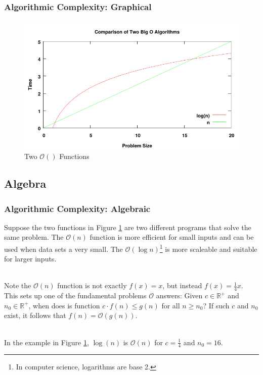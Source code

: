 \documentclass[aspectratio=169]{beamer}
\begin{document}
\begin{frame}
\frametitle{Algorithmic Complexity: Graphical}
\begin{figure}
\includegraphics[scale=0.725]{../artifacts/big-o-plot.pdf}
\caption{Two $\mathcal{O}()$ Functions}
\label{fig:big-o}
\end{figure}
\end{frame}

\subsection{Algebra}
\begin{frame}
\frametitle{Algorithmic Complexity: Algebraic}
Suppose the two functions in Figure \ref{fig:big-o} are two different programs that solve the same problem. The $\mathcal{O}(n)$ function is more efficient for small inputs and can be used when data sets a very small. The $\mathcal{O}(\log n)$\footnote{In computer science, logarithms are base 2.} is more scaleable and suitable for larger inputs.

\mbox{}\\
\pause
Note the $\mathcal{O}(n)$ function is not exactly $f(x) = x$, but instead $f(x) = \frac 14 x$. This sets up one of the fundamental problems $\mathcal{O}$ answers: Given $c \in \mathbb{R}^+$ and $n_0 \in \mathbb{R}^+$, when does is function $c \cdot f(n) \le g(n)$ for all $n \ge n_0$? If such $c$ and $n_0$ exist, it follows that $f(n) = \mathcal{O}(g(n))$.

\mbox{}\\
\pause
In the example in Figure \ref{fig:big-o}, $\log(n)$ is $\mathcal{O}(n)$ for $c = \frac 14$ and $n_0 = 16$.
\end{frame}
\end{document}
